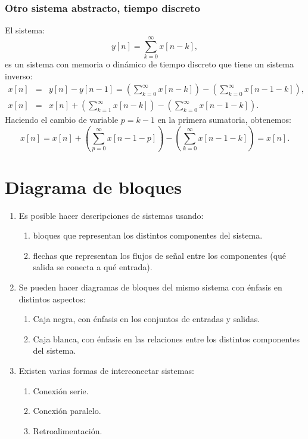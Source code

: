\subsubsection{Otro sistema abstracto, tiempo discreto}
El sistema:
\begin{equation}
	y[n] = \sum_{k=0}^{\infty} x[n-k],
\end{equation}
es un sistema con memoria o dinámico de tiempo discreto que tiene un sistema inverso:
\begin{eqnarray}
	x[n] &=& y[n] - y[n-1] = \left(\sum_{k=0}^{\infty} x[n-k]\right) - \left( \sum_{k=0}^{\infty}x[n-1-k]\right), \\
	x[n] &=& x[n] + \left( \sum_{k=1}^{\infty} x[n-k]\right) - \left(\sum_{k=0}^{\infty}x[n-1-k]\right).
\end{eqnarray}
Haciendo el cambio de variable $p = k - 1$ en la primera sumatoria, obtenemos:
\begin{equation}
	x[n] = x[n] + \left( \sum_{p=0}^{\infty} x[n-1-p]\right) - \left(\sum_{k=0}^{\infty} x[n-1-k]\right) = x[n].
\end{equation}

\section{Diagrama de bloques}

\begin{enumerate}
	\item Es posible hacer descripciones de sistemas usando:
	\begin{enumerate}
		\item bloques que representan los distintos componentes del sistema.
		\item flechas que representan los flujos de señal entre los componentes (qué salida se conecta a qué entrada).
	\end{enumerate}
	
	\item Se pueden hacer diagramas de bloques del mismo sistema con énfasis en distintos aspectos:
	\begin{enumerate}
		\item Caja negra, con énfasis en los conjuntos de entradas y salidas.
		\item Caja blanca, con énfasis en las relaciones entre los distintos componentes del sistema.
	\end{enumerate}
	
	\item Existen varias formas de interconectar sistemas:
	\begin{enumerate}
		\item Conexión serie.
		\item Conexión paralelo.
		\item Retroalimentación.
	\end{enumerate}
\end{enumerate}

